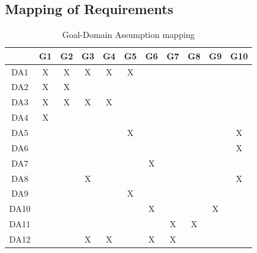 \documentclass[12pt]{report}
\begin{document}
\subsection{Mapping of Requirements}
\begin{table}[h]
    \centering
    \begin{tabular}{|c|c|c|c|c|c|c|c|c|c|c|}
        \hline
           & G1 & G2 & G3 & G4 & G5 & G6 & G7 & G8 & G9 & G10\\
        \hline
        DA1&X&X&X&X&X&&&&&\\
        \hline
        DA2&X&X&&&&&&&&\\
        \hline
        DA3&X&X&X&X&&&&&&\\
        \hline
        DA4&X&&&&&&&&&\\
        \hline
        DA5&&&&&X&&&&&X\\
        \hline
        DA6&&&&&&&&&&X\\
        \hline
        DA7&&&&&&X&&&&\\
        \hline
        DA8&&&X&&&&&&&X\\
        \hline
        DA9&&&&&X&&&&&\\
        \hline
        DA10&&&&&&X&&&X&\\
        \hline
        DA11&&&&&&&X&X&&\\
        \hline
        DA12&&&X&X&&X&X&&&\\
        \hline
    \end{tabular}
    \caption{Goal-Domain Assumption mapping}
    \end{table}
\clearpage
\end{document}
